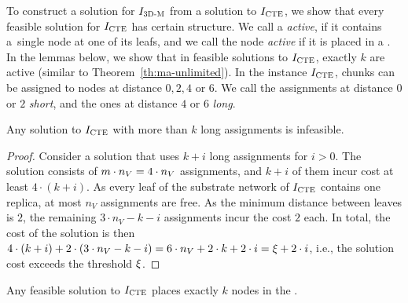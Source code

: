 To construct a solution for $I_{\mathrm{\textsc{3D-M}}}$ from a solution to $I_{\mathrm{\textsc{CTE}}}$, we show that every feasible solution for $I_{\mathrm{\textsc{CTE}}}$ has certain structure.
We call a {\TripleGadget} \textit{active}, if it contains a~single node at one of its leafs, and we call the node \textit{active} if it is placed in a {\TripleGadget}.
In the lemmas below, we show that in feasible solutions to $I_{\mathrm{\textsc{CTE}}}$, exactly $k$ \TripleGadgets{} are active (similar to Theorem~\ref{th:ma-unlimited}).
In the instance $I_{\mathrm{\textsc{CTE}}}$, chunks can be assigned to nodes at distance $0, 2, 4$ or $6$.
We call the assignments at distance $0$ or $2$ \emph{short}, and the ones at distance $4$ or $6$ \emph{long}.


  \begin{lemma}
    Any solution to $I_{\mathrm{\textsc{CTE}}}$ with more than $k$ long assignments is infeasible.
    \label{lem:infeasible}
  \end{lemma}
  \begin{proof}
    Consider a solution that uses $k+i$ long assignments for $i>0$.
    The solution consists of $m \cdot n_V = 4\cdot n_V$ assignments, and $k+i$ of them incur cost at least $4\cdot (k+i)$.
    As every leaf of the substrate network of $I_{\mathrm{\textsc{CTE}}}$ contains one replica, at most $n_V$ assignments are free.
    As the minimum distance between leaves is $2$, the remaining $3\cdot n_V - k-i$ assignments incur the cost $2$ each.
    In total, the cost of the solution is then $4\cdot (k+i) + 2\cdot (3\cdot n_V - k-i) = 6\cdot n_V + 2\cdot k + 2\cdot i = \xi + 2\cdot i$, i.e., the solution cost exceeds the threshold $\xi$.
  \end{proof}

  
\begin{lemma}
  Any feasible solution to $I_{\mathrm{\textsc{CTE}}}$ places exactly $k$ nodes in the \MatchSubtree.
  \label{lem:n-matchsubtree-ma}
\end{lemma}

